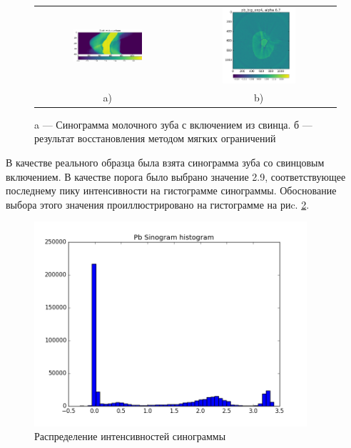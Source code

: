 \begin{figure}
\centering
\begin{tabular}{@{}c@{}c}
    \includegraphics[width=0.50\textwidth]{Dissertation/images/part2_img/tooth_sino}
&
    \includegraphics[width=0.50\textwidth]{Dissertation/images/part2_img/soft_ineq_pb_tooth}
\\
   \small a) & \small b)
\end{tabular}
  \caption{a --- Синограмма молочного зуба с включением из свинца. б --- результат восстановления методом мягких ограничений}
\label{fig:tooth_sino_rec}
\end{figure}

В качестве реального образца была взята синограмма зуба со свинцовым включением.
В качестве порога было выбрано значение 2.9, соответствующее последнему пику интенсивности на гистограмме синограммы.
Обоснование выбора этого значения проиллюстрировано на гистограмме на риc. \ref{fig:pb_hist}.


\begin{figure}
  \centering
  \includegraphics[width=0.9\textwidth]{Dissertation/images/part2_img/pb_hist}
  \caption{Распределение интенсивностей синограммы}
  \label{fig:pb_hist}
\end{figure}




